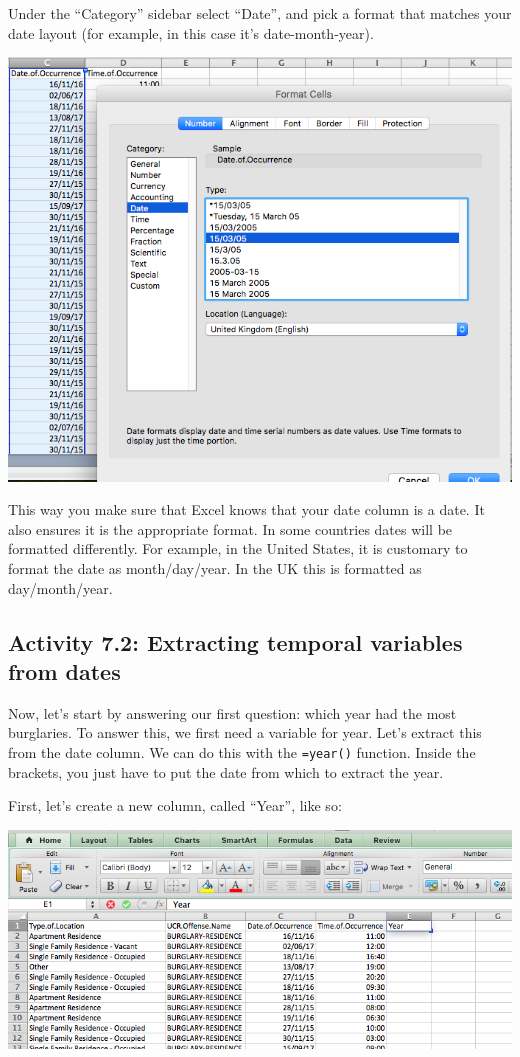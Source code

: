 \documentclass[
]{book}
\begin{document}
Under the ``Category'' sidebar select ``Date'', and pick a format that matches your date layout (for example, in this case it's date-month-year).

\includegraphics{imgs/format_date_2.png}

This way you make sure that Excel knows that your date column is a date. It also ensures it is the appropriate format. In some countries dates will be formatted differently. For example, in the United States, it is customary to format the date as month/day/year. In the UK this is formatted as day/month/year.

\hypertarget{activity-7.2-extracting-temporal-variables-from-dates}{%
\subsection{Activity 7.2: Extracting temporal variables from dates}\label{activity-7.2-extracting-temporal-variables-from-dates}}

Now, let's start by answering our first question: which year had the most burglaries. To answer this, we first need a variable for year. Let's extract this from the date column. We can do this with the \texttt{=year()} function. Inside the brackets, you just have to put the date from which to extract the year.

First, let's create a new column, called ``Year'', like so:

\includegraphics{imgs/create_year_col.png}
\end{document}
